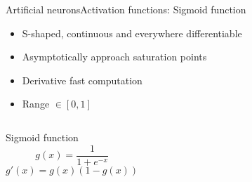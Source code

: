 \documentclass[10pt,compress]{beamer} %
\begin{document}
\begin{frame}{Artificial neurons}{Activation functions: Sigmoid function}
	\begin{itemize}
		\item S-shaped, continuous and everywhere differentiable
		\item Asymptotically approach saturation points
		\item Derivative fast computation
        \item Range $\in [0, 1]$
	\end{itemize}
    \begin{columns}

                      
                      
	\begin{block}{Sigmoid function}
	\begin{equation*}
	g(x) = \frac{1}{1+e^{-x}}
	\end{equation*}
	\begin{equation*}
	g'(x) = g(x) (1-g(x))
	\end{equation*}
	\end{block}
    \end{columns}
\end{frame}
\end{document}
